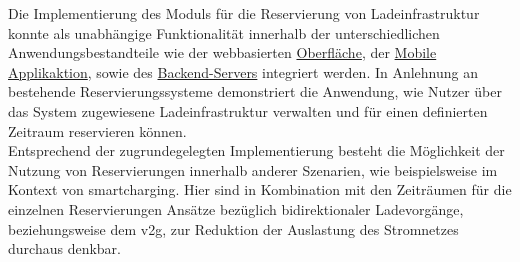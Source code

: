 Die Implementierung des Moduls für die Reservierung von Ladeinfrastruktur konnte als unabhängige Funktionalität innerhalb der unterschiedlichen Anwendungsbestandteile wie der webbasierten \href{https://github.com/JulianHBuecher/ev-dashboard}{Oberfläche}, der \href{https://github.com/JulianHBuecher/ev-mobile}{Mobile Applikaktion}, sowie des \href{https://github.com/JulianHBuecher/ev-server}{Backend-Servers} integriert werden.
In Anlehnung an bestehende Reservierungssysteme demonstriert die Anwendung, wie Nutzer \"uber das System zugewiesene Ladeinfrastruktur verwalten und f\"ur einen definierten Zeitraum reservieren k\"onnen.\\
Entsprechend der zugrundegelegten Implementierung besteht die M\"oglichkeit der Nutzung von Reservierungen innerhalb anderer Szenarien, wie beispielsweise im Kontext von \Gls{smartcharging}. Hier sind in Kombination mit den Zeitr\"aumen für die einzelnen Reservierungen Ans\"atze bez\"uglich bidirektionaler Ladevorg\"ange, beziehungsweise dem \acrfull{v2g}, zur Reduktion der Auslastung des Stromnetzes durchaus denkbar.